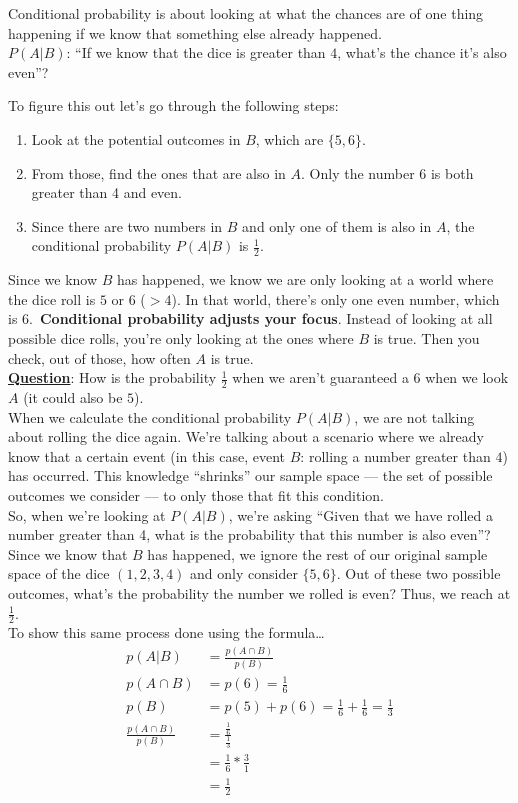 \documentclass{mlnotes}
\begin{document}
Conditional probability is about looking at what the chances are of one thing
happening if we know that something else already happened.
\\[12pt]
\(P(A|B)\): ``If we know that the dice is greater than \(4\), what's the chance
it's also even''?

To figure this out let's go through the following steps:
\begin{enumerate}
  \item Look at the potential outcomes in \(B\), which are \(\{5, 6\}\).
  \item From those, find the ones that are also in \(A\). Only the number \(6\)
  is both greater than 4 and even.
  \item Since there are two numbers in \(B\) and only one of them is also in
  \(A\), the conditional probability \(P(A|B)\) is \(\frac{1}{2}\).
\end{enumerate}

Since we know \(B\) has happened, we know we are only looking at a world where
the dice roll is \(5\) or \(6\) (\(> 4\)). In that world, there's only one even
number, which is 6.\ \textbf{Conditional probability adjusts your focus}.
Instead of looking at all possible dice rolls, you're only looking at the ones
where \(B\) is true. Then you check, out of those, how often \(A\) is true.
\\[12pt]
\textbf{\underline{Question}}: How is the probability \(\frac{1}{2}\) when we aren't
guaranteed a \(6\) when we look \(A\) (it could also be \(5\)).
\\[12pt]
When we calculate the conditional probability \(P(A|B)\), we are not talking
about rolling the dice again. We're talking about a scenario where we already
know that a certain event (in this case, event \(B\): rolling a number greater
than \(4\)) has occurred. This knowledge ``shrinks'' our sample space --- the
set of possible outcomes we consider --- to only those that fit this condition.
\\[12pt]
So, when we're looking at \(P(A|B)\), we're asking ``Given that we have rolled a
number greater than 4, what is the probability that this number is also even''?
\\[12pt]
Since we know that \(B\) has happened, we ignore the rest of our original sample
space of the dice \((1,2,3,4)\) and only consider \(\{5,6\}\). Out of these two
possible outcomes, what's the probability the number we rolled is even? Thus, we
reach at \(\frac{1}{2}\).
\\[12pt]
To show this same process done using the formula\ldots
\begin{align*}
  p(A|B) &= \frac{p(A \cap B)}{p(B)}\\
  p(A \cap B) &= p(6) = \frac{1}{6}\\
  p(B) &= p(5) + p(6) = \frac{1}{6} + \frac{1}{6} = \frac{1}{3}\\
  \frac{p(A \cap B)}{p(B)} &= \frac{\frac{1}{6}}{\frac{1}{3}}\\
                           &= \frac{1}{6} * \frac{3}{1}\\ 
                           &= \frac{1}{2}
\end{align*}
\end{document}
